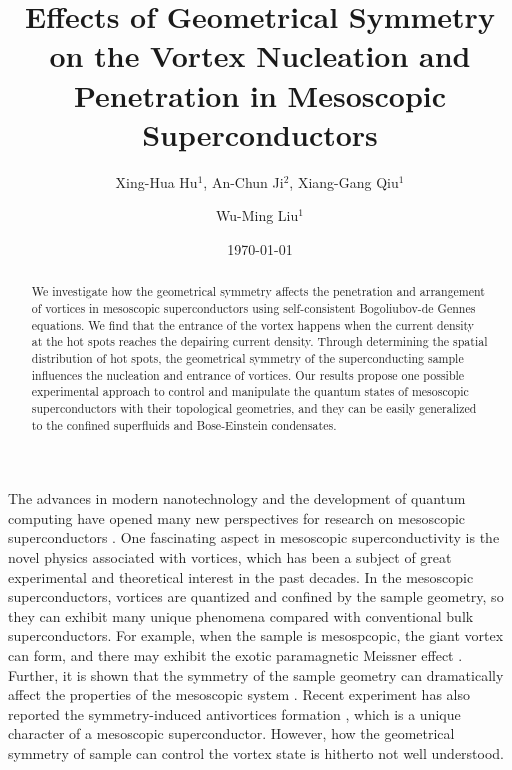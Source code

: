 \documentclass[aps,prl,showpacs,twocolumn]{revtex4}
\begin{document}
\title{Effects of Geometrical Symmetry on the Vortex
Nucleation and Penetration in Mesoscopic Superconductors}
\author{Xing-Hua Hu$^1$, An-Chun Ji$^2$, Xiang-Gang Qiu$^{1}$}
\author{Wu-Ming Liu$^1$}
\address{$^1$Beijing National Laboratory for Condensed Matter Physics,
Institute of Physics, Chinese Academy of Sciences, Beijing 100190,
China}
\address{$^2$Center of Theoretical Physics, Department of Physics, Capital Normal University, Beijing 100048, China}
\date{\today}
\begin{abstract}
We investigate how the geometrical symmetry affects the penetration
and arrangement of vortices in mesoscopic superconductors using
self-consistent Bogoliubov-de Gennes equations. We find that the
entrance of the vortex happens when the current density at the hot
spots reaches the depairing current density. Through determining the
spatial distribution of hot spots, the geometrical symmetry of the
superconducting sample influences the nucleation and entrance of
vortices. Our results propose one possible experimental approach to
control and manipulate the quantum states of mesoscopic
superconductors with their topological geometries, and they can be
easily generalized to the confined superfluids and Bose-Einstein
condensates.
\end{abstract}


\maketitle

The advances in modern nanotechnology and the development of quantum
computing have opened many new perspectives for research on
mesoscopic superconductors \cite{moshchalkov}. One fascinating
aspect in mesoscopic superconductivity is the novel physics
associated with vortices, which has been a subject of great
experimental
\cite{victor,hess2,chibotaru,grigorieva,crabtree,nishio2,cren,geim1,geim2}
and theoretical \cite{brandt,victorprb,baelus,bonca} interest in the
past decades. In the mesoscopic superconductors, vortices are
quantized and confined by the  sample geometry, so they can exhibit
many unique phenomena compared with conventional bulk
superconductors. For example, when the sample is mesospcopic, the
giant vortex can form, and there may exhibit the exotic paramagnetic
Meissner effect \cite{victorprb}. Further, it is shown that the
symmetry of the sample geometry can dramatically affect the
properties of the mesoscopic system \cite{victor}. Recent experiment
has also reported the symmetry-induced antivortices formation
\cite{chibotaru}, which is a unique character of a mesoscopic
superconductor. However, how the geometrical symmetry of sample can
control the vortex state is hitherto not well understood.
\end{document}
